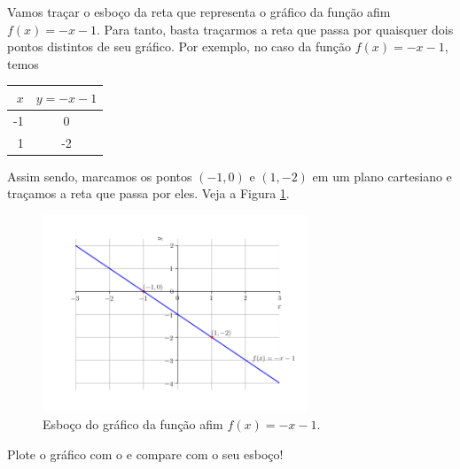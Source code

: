 \begin{ex}
  Vamos traçar o esboço da reta que representa o gráfico da função afim $f(x) = -x-1$. Para tanto, basta traçarmos a reta que passa por quaisquer dois pontos distintos de seu gráfico. Por exemplo, no caso da função $f(x) = -x -1$, temos
  \begin{center}
  \begin{tabular}[H]{r|c}
    $x$ & $y = -x-1$\\\hline
    -1  & 0\\
    1   & -2\\\hline
  \end{tabular}
\end{center}
Assim sendo, marcamos os pontos $(-1, 0)$ e $(1, -2)$ em um plano cartesiano e traçamos a reta que passa por eles. Veja a Figura \ref{fig:exeresol_funafim_grafico}.

\begin{figure}[H]
  \centering
  \includegraphics[width=0.7\textwidth]{./cap_funcao/dados/fig_exeresol_funafim_grafico/fig_exeresol_funafim_grafico}
  \caption{Esboço do gráfico da função afim $f(x)=-x-1$.}
  \label{fig:exeresol_funafim_grafico}
\end{figure}

\ifispython
Plote o gráfico com o {\sympy} e compare com o seu esboço!
\fi
\end{ex}


